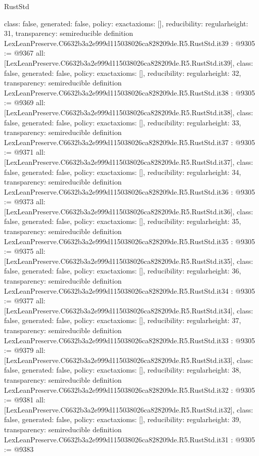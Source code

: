 \begin{lexlean}{RustStd}
\begin{coremodule}
{  class: false,
  generated: false,
  policy: exact{axioms: []},
  reducibility: regular{height: 31},
  transparency: semireducible
}
definition LexLeanPreserve.C6632b3a2e999d115038026ca828209de.R5.RustStd.it39 : @9305 := @9367 {
  all: [LexLeanPreserve.C6632b3a2e999d115038026ca828209de.R5.RustStd.it39],
  class: false,
  generated: false,
  policy: exact{axioms: []},
  reducibility: regular{height: 32},
  transparency: semireducible
}
definition LexLeanPreserve.C6632b3a2e999d115038026ca828209de.R5.RustStd.it38 : @9305 := @9369 {
  all: [LexLeanPreserve.C6632b3a2e999d115038026ca828209de.R5.RustStd.it38],
  class: false,
  generated: false,
  policy: exact{axioms: []},
  reducibility: regular{height: 33},
  transparency: semireducible
}
definition LexLeanPreserve.C6632b3a2e999d115038026ca828209de.R5.RustStd.it37 : @9305 := @9371 {
  all: [LexLeanPreserve.C6632b3a2e999d115038026ca828209de.R5.RustStd.it37],
  class: false,
  generated: false,
  policy: exact{axioms: []},
  reducibility: regular{height: 34},
  transparency: semireducible
}
definition LexLeanPreserve.C6632b3a2e999d115038026ca828209de.R5.RustStd.it36 : @9305 := @9373 {
  all: [LexLeanPreserve.C6632b3a2e999d115038026ca828209de.R5.RustStd.it36],
  class: false,
  generated: false,
  policy: exact{axioms: []},
  reducibility: regular{height: 35},
  transparency: semireducible
}
definition LexLeanPreserve.C6632b3a2e999d115038026ca828209de.R5.RustStd.it35 : @9305 := @9375 {
  all: [LexLeanPreserve.C6632b3a2e999d115038026ca828209de.R5.RustStd.it35],
  class: false,
  generated: false,
  policy: exact{axioms: []},
  reducibility: regular{height: 36},
  transparency: semireducible
}
definition LexLeanPreserve.C6632b3a2e999d115038026ca828209de.R5.RustStd.it34 : @9305 := @9377 {
  all: [LexLeanPreserve.C6632b3a2e999d115038026ca828209de.R5.RustStd.it34],
  class: false,
  generated: false,
  policy: exact{axioms: []},
  reducibility: regular{height: 37},
  transparency: semireducible
}
definition LexLeanPreserve.C6632b3a2e999d115038026ca828209de.R5.RustStd.it33 : @9305 := @9379 {
  all: [LexLeanPreserve.C6632b3a2e999d115038026ca828209de.R5.RustStd.it33],
  class: false,
  generated: false,
  policy: exact{axioms: []},
  reducibility: regular{height: 38},
  transparency: semireducible
}
definition LexLeanPreserve.C6632b3a2e999d115038026ca828209de.R5.RustStd.it32 : @9305 := @9381 {
  all: [LexLeanPreserve.C6632b3a2e999d115038026ca828209de.R5.RustStd.it32],
  class: false,
  generated: false,
  policy: exact{axioms: []},
  reducibility: regular{height: 39},
  transparency: semireducible
}
definition LexLeanPreserve.C6632b3a2e999d115038026ca828209de.R5.RustStd.it31 : @9305 := @9383 {
}
\end{coremodule}
\end{lexlean}
